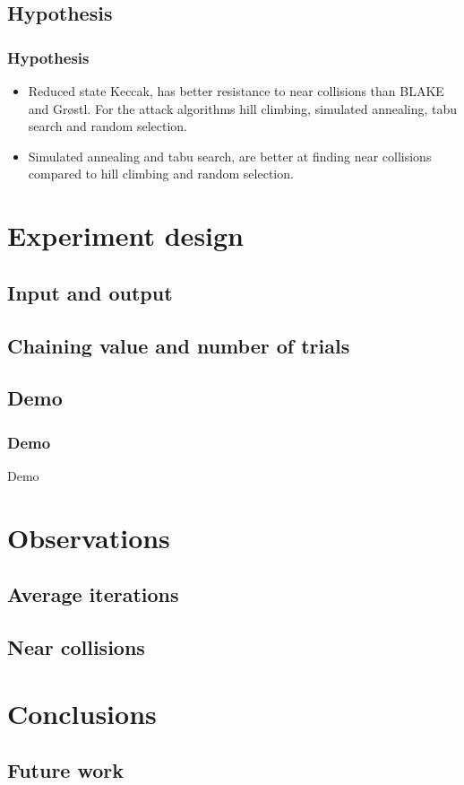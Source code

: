 \documentclass{beamer}
\begin{document}
\subsection{Hypothesis}

\begin{frame}
\frametitle{Hypothesis}
\begin{itemize}
\item Reduced state Keccak, has better resistance to near collisions than BLAKE and Gr{\o}stl. For 
the attack algorithms hill climbing, simulated annealing, tabu search and random selection.
\item Simulated annealing and tabu search, are better at finding near collisions compared to hill 
climbing and random selection.      
\end{itemize}
\end{frame}

\section{Experiment design}

\subsection{Input and output}

\subsection{Chaining value and number of trials}

\subsection{Demo}
\begin{frame}
\frametitle{Demo}
Demo
\end{frame}

\section{Observations}
\subsection{Average iterations}
\subsection{Near collisions}

\section{Conclusions}
\subsection{Future work}
\end{document}
